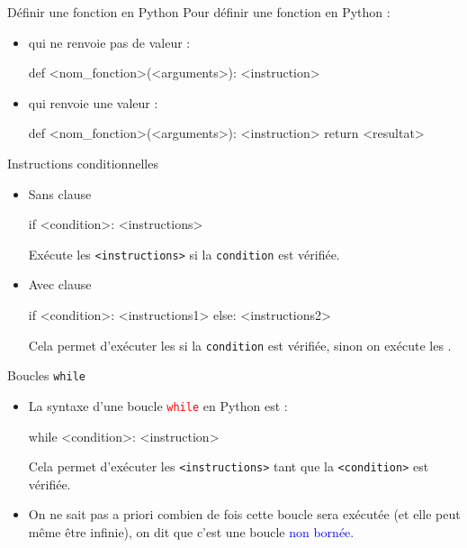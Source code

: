 \documentclass[10pt]{beamer}
\begin{document}
\begin{frame}[fragile]{\Ctitle}{\stitle}
	\begin{alertblock}{Définir une fonction en Python}
		Pour définir une fonction en Python :
		\begin{itemize}
		\item<2-> qui ne renvoie pas de valeur :\begin{codepython}
def <nom_fonction>(<arguments>):
	<instruction>
		\end{codepython}
		\item<2-> qui renvoie une valeur : \begin{codepython}
def <nom_fonction>(<arguments>):
	<instruction>
	return <resultat>
	\end{codepython}
\end{itemize}
	\end{alertblock}
\end{frame}

\begin{frame}[fragile]{\Ctitle}{\stitle}
	\begin{alertblock}{Instructions conditionnelles}
		\begin{itemize}
			\item<1-> Sans clause 
			\begin{codepython}
if <condition>:
	<instructions>
			\end{codepython}
			Exécute les {\tt <instructions>} si la {\tt condition} est vérifiée.
			\item<2-> Avec clause 
			\begin{codepython}
if <condition>:
	<instructions1>
else:
	<instructions2>
			\end{codepython}
		Cela permet d'exécuter les {\tt <instructions1>} si la {\tt condition} est vérifiée, sinon on exécute les {\tt <instructions2>}.
		\end{itemize}
	\end{alertblock}
\end{frame}

\begin{frame}[fragile]{\Ctitle}{\stitle}
	\begin{alertblock}{Boucles {\tt while}}
		\begin{itemize}
			\item<2-> La syntaxe d'une boucle \textcolor{red}{\tt while}  en Python est :
				\begin{codepython}
while <condition>:
	<instruction>
			\end{codepython}
			      Cela permet d'exécuter les {\tt <instructions>} tant que la {\tt <condition>} est  vérifiée.
			\item<3->  On ne sait pas a priori combien de fois cette boucle sera exécutée (et elle peut même être infinie), on dit que c'est une boucle \textcolor{blue}{non bornée}.
		\end{itemize}
	\end{alertblock}
\end{frame}
\end{document}
